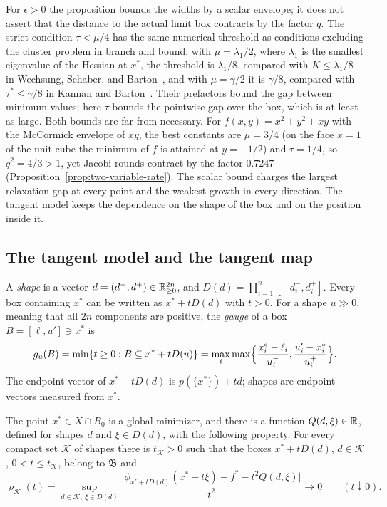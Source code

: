 For $\epsilon>0$ the proposition bounds the widths by a scalar envelope; it
does not assert that the distance to the actual limit box contracts by the
factor $q$. The strict condition $\tau<\mu/4$ has the same numerical
threshold as conditions excluding the cluster problem in branch and bound: with
$\mu=\lambda_1/2$, where $\lambda_1$ is the smallest eigenvalue of the
Hessian at $x^*$, the threshold is $\lambda_1/8$, compared with
$K\le\lambda_1/8$ in Wechsung,
Schaber, and Barton~\cite{wechsung2014-the-cluster-problem-revisited}, and
with $\mu=\gamma/2$ it is $\gamma/8$, compared with
$\tau^*\le\gamma/8$ in Kannan and
Barton~\cite{kannan2017-the-cluster-problem-in-constrained}. Their
prefactors bound the gap between minimum values; here $\tau$ bounds the
pointwise gap over the box, which is at least as large. Both bounds are far
from necessary. For $f(x,y)=x^2+y^2+xy$ with the McCormick envelope of $xy$,
the best constants are $\mu=3/4$ (on the face $x=1$ of the unit cube the
minimum of $f$ is attained at $y=-1/2$) and $\tau=1/4$, so $q^2=4/3>1$, yet
Jacobi rounds contract by the factor $0.7247$
(Proposition~\ref{prop:two-variable-rate}). The scalar bound charges the
largest relaxation gap at every point and the weakest growth in every
direction. The tangent model keeps the dependence on the shape of the box
and on the position inside it.

\subsection{The tangent model and the tangent map}\label{sec:local-rates-tangent}

A \emph{shape} is a vector $d=(d^-,d^+)\in\mathbb{R}^{2n}_{\ge0}$, and
$D(d)=\prod_{i=1}^n[-d_i^-,d_i^+]$. Every box containing $x^*$ can be written
as $x^*+tD(d)$ with $t>0$. For a shape $u\gg0$, meaning that all $2n$
components are positive, the \emph{gauge} of a box $B=[\ell,u']\ni x^*$ is
\[
  g_u(B)=\min\{t\ge0:B\subseteq x^*+tD(u)\}
  =\max_i\max\Bigl\{\frac{x_i^*-\ell_i}{u_i^-},\frac{u'_i-x_i^*}{u_i^+}\Bigr\}.
\]
The endpoint vector of $x^*+tD(d)$ is $p(\{x^*\})+td$; shapes are endpoint
vectors measured from $x^*$.

\begin{assumption}\label{ass:tangent}
The point $x^*\in X\cap B_0$ is a global minimizer, and there is a function
$Q(d,\xi)\in\mathbb{R}$, defined for shapes $d$ and $\xi\in D(d)$, with the following
property. For every compact set $\mathcal K$ of shapes there is $t_{\mathcal K}>0$
such that the boxes $x^*+tD(d)$, $d\in\mathcal K$, $0<t\le t_{\mathcal K}$,
belong to $\mathfrak B$ and
\begin{equation}\label{eq:tangent}
  \varrho_{\mathcal K}(t)=\sup_{d\in\mathcal K,\ \xi\in D(d)}
  \frac{\bigl|\phi_{x^*+tD(d)}(x^*+t\xi)-f^*-t^2Q(d,\xi)\bigr|}{t^2}
  \longrightarrow0\qquad(t\downarrow0).
\end{equation}
\end{assumption}

